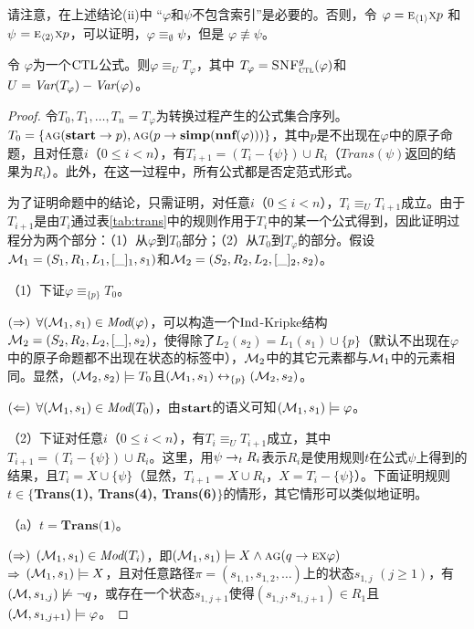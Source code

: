 请注意，在上述结论(ii)中  “$\varphi$和$\psi$不包含索引”是必要的。否则，令 $\varphi=\textsc{e}_{{\langle{1}\rangle}}\textsc{x} p$ 和  
$\psi$ $=\textsc{e}_{{\langle{2}\rangle}}\textsc{x} p$，可以证明，$\varphi\equiv_\emptyset \psi$，但是 $\varphi\not\equiv\psi$。
\begin{proposition}\label{prop:transform:V:EQ}
	令 $\varphi$为一个$\textrm{CTL}$公式。则$\varphi\equiv_UT_\varphi$，其中 $T_\varphi={\textsc{SNF}_{\textsc{ctl}}^g}(\varphi)$和
	$U=\textit{Var}(T_\varphi)-\textit{Var}(\varphi)$。
\end{proposition}
\begin{proof}
	令$T_0, T_1, \dots, T_n=T_{\varphi}$为转换过程产生的公式集合序列。$T_0=\{\textsc{a} \textsc{g}(\textbf{start} \rightarrow p), \textsc{a} \textsc{g}(p \rightarrow \textbf{simp}(\textbf{nnf}(\varphi)))\}$，其中$p$是不出现在$\varphi$中的原子命题，且对任意$i$（$0\leq i < n$），有$T_{i+1} = (T_i-\{\psi\}) \cup R_i$（$Trans(\psi)$返回的结果为$R_i$）。此外，在这一过程中，所有公式都是否定范式形式。
	
	为了证明命题中的结论，只需证明，对任意$i$（$0\leq i < n$），$T_i \equiv_{U} T_{i+1}$成立。由于$T_{i+1}$是由$T_i$通过表\ref{tab:trans}中的规则作用于$T_i$中的某一个公式得到，因此证明过程分为两个部分：（1）从$\varphi$到$T_0$部分；（2）从$T_0$到$T_{\varphi}$的部分。假设${\cal M}_1=(S_1,R_1,L_1,[\_]_1,s_1)$和${\cal M}_2=(S_2,R_2,L_2, [\_]_2, s_2)$。
	
	（1）下证$\varphi \equiv_{\{p\}} T_0$。
	
	$(\Rightarrow)$ $\forall ({\cal M}_1, s_1) \in \textit{Mod}(\varphi)$，可以构造一个$\textrm{Ind}$-Kripke结构${\cal M}_2=(S_2,R_2,L_2,[\_],s_2)$，使得除了$L_2(s_2)=L_1(s_1) \cup \{p\}$（默认不出现在$\varphi$中的原子命题都不出现在状态的标签中），${\cal M}_2$中的其它元素都与${\cal M}_1$中的元素相同。显然，$({\cal M}_2,s_2)\models T_0$且$({\cal M}_1,s_1) \leftrightarrow_{\{p\}} ({\cal M}_2, s_2)$。
	
	$(\Leftarrow)$ $\forall ({\cal M}_1,s_1) \in \textit{Mod}(T_0)$，由$\textbf{start}$的语义可知$({\cal M}_1,s_1) \models \varphi$。
	
	（2）下证对任意$i$（$0\leq i < n$），有$T_i \equiv_{U} T_{i+1}$成立，其中$T_{i+1} = (T_i-\{\psi\}) \cup R_i$。这里，用$\psi \rightarrow_t R_i$表示$R_i$是使用规则$t$在公式$\psi$上得到的结果，且$T_i=X\cup \{\psi\}$（显然，$T_{i+1}=X\cup R_i$，$X=T_i-\{\psi\}$）。下面证明规则$t\in \{$\textbf{Trans(1), Trans(4), Trans(6)}$\}$的情形，其它情形可以类似地证明。
	
	（a）$t=\textbf{Trans(1)}$。
	
	$(\Rightarrow)$ $({\cal M}_1,s_1)\in \textit{Mod}(T_i)$，即$({\cal M}_1, s_1) \models X \wedge \textsc{a}\textsc{g}(q \rightarrow \textsc{e} \textsc{x} \varphi)$\\
	$\Rightarrow$ $({\cal M}_1,s_1) \models X$，且对任意路径$\pi=(s_{1,1},s_{1,2},\dots)$上的状态$s_{1,j}$ $(j\geq 1)$，有$({\cal M},s_{1,j}) \not \models \neg q$，或存在一个状态$s_{1,j+1}$使得$(s_{1,j},s_{1,j+1})
	\in R_1$且$({\cal M},s_{1,j+1}) \models \varphi$。
	

\end{proof}
